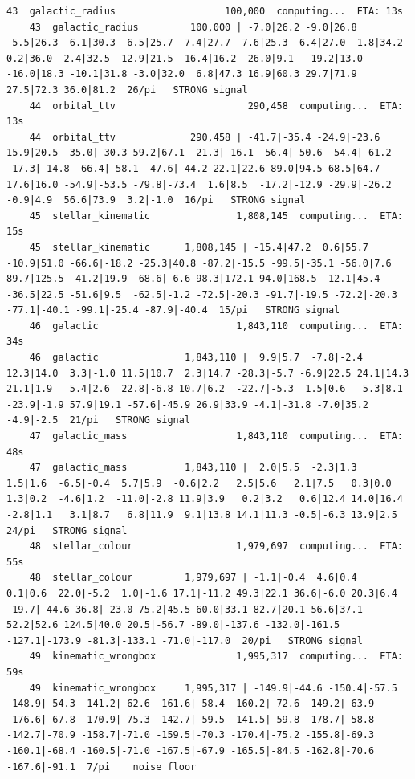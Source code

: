 \documentclass[11pt, letterpaper, openany]{book}
\begin{document}
\begin{empiricalbox}
\begin{lstlisting}[style=terminal]
    43  galactic_radius                   100,000  computing...  ETA: 13s
    43  galactic_radius         100,000 | -7.0|26.2 -9.0|26.8 -5.5|26.3 -6.1|30.3 -6.5|25.7 -7.4|27.7 -7.6|25.3 -6.4|27.0 -1.8|34.2  0.2|36.0 -2.4|32.5 -12.9|21.5 -16.4|16.2 -26.0|9.1  -19.2|13.0 -16.0|18.3 -10.1|31.8 -3.0|32.0  6.8|47.3 16.9|60.3 29.7|71.9 27.5|72.3 36.0|81.2  26/pi   STRONG signal
    44  orbital_ttv                       290,458  computing...  ETA: 13s
    44  orbital_ttv             290,458 | -41.7|-35.4 -24.9|-23.6 15.9|20.5 -35.0|-30.3 59.2|67.1 -21.3|-16.1 -56.4|-50.6 -54.4|-61.2 -17.3|-14.8 -66.4|-58.1 -47.6|-44.2 22.1|22.6 89.0|94.5 68.5|64.7 17.6|16.0 -54.9|-53.5 -79.8|-73.4  1.6|8.5  -17.2|-12.9 -29.9|-26.2 -0.9|4.9  56.6|73.9  3.2|-1.0  16/pi   STRONG signal
    45  stellar_kinematic               1,808,145  computing...  ETA: 15s
    45  stellar_kinematic      1,808,145 | -15.4|47.2  0.6|55.7 -10.9|51.0 -66.6|-18.2 -25.3|40.8 -87.2|-15.5 -99.5|-35.1 -56.0|7.6  89.7|125.5 -41.2|19.9 -68.6|-6.6 98.3|172.1 94.0|168.5 -12.1|45.4 -36.5|22.5 -51.6|9.5  -62.5|-1.2 -72.5|-20.3 -91.7|-19.5 -72.2|-20.3 -77.1|-40.1 -99.1|-25.4 -87.9|-40.4  15/pi   STRONG signal
    46  galactic                        1,843,110  computing...  ETA: 34s
    46  galactic               1,843,110 |  9.9|5.7  -7.8|-2.4 12.3|14.0  3.3|-1.0 11.5|10.7  2.3|14.7 -28.3|-5.7 -6.9|22.5 24.1|14.3 21.1|1.9   5.4|2.6  22.8|-6.8 10.7|6.2  -22.7|-5.3  1.5|0.6   5.3|8.1  -23.9|-1.9 57.9|19.1 -57.6|-45.9 26.9|33.9 -4.1|-31.8 -7.0|35.2 -4.9|-2.5  21/pi   STRONG signal
    47  galactic_mass                   1,843,110  computing...  ETA: 48s
    47  galactic_mass          1,843,110 |  2.0|5.5  -2.3|1.3   1.5|1.6  -6.5|-0.4  5.7|5.9  -0.6|2.2   2.5|5.6   2.1|7.5   0.3|0.0   1.3|0.2  -4.6|1.2  -11.0|-2.8 11.9|3.9   0.2|3.2   0.6|12.4 14.0|16.4 -2.8|1.1   3.1|8.7   6.8|11.9  9.1|13.8 14.1|11.3 -0.5|-6.3 13.9|2.5   24/pi   STRONG signal
    48  stellar_colour                  1,979,697  computing...  ETA: 55s
    48  stellar_colour         1,979,697 | -1.1|-0.4  4.6|0.4   0.1|0.6  22.0|-5.2  1.0|-1.6 17.1|-11.2 49.3|22.1 36.6|-6.0 20.3|6.4  -19.7|-44.6 36.8|-23.0 75.2|45.5 60.0|33.1 82.7|20.1 56.6|37.1 52.2|52.6 124.5|40.0 20.5|-56.7 -89.0|-137.6 -132.0|-161.5 -127.1|-173.9 -81.3|-133.1 -71.0|-117.0  20/pi   STRONG signal
    49  kinematic_wrongbox              1,995,317  computing...  ETA: 59s
    49  kinematic_wrongbox     1,995,317 | -149.9|-44.6 -150.4|-57.5 -148.9|-54.3 -141.2|-62.6 -161.6|-58.4 -160.2|-72.6 -149.2|-63.9 -176.6|-67.8 -170.9|-75.3 -142.7|-59.5 -141.5|-59.8 -178.7|-58.8 -142.7|-70.9 -158.7|-71.0 -159.5|-70.3 -170.4|-75.2 -155.8|-69.3 -160.1|-68.4 -160.5|-71.0 -167.5|-67.9 -165.5|-84.5 -162.8|-70.6 -167.6|-91.1  7/pi    noise floor

\end{lstlisting}
\end{empiricalbox}
\end{document}
